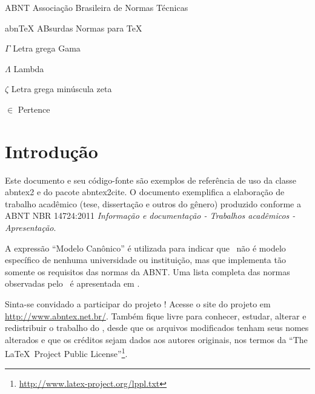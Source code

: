 \documentclass[
	12pt,				%
	openright,			%
    twoside,			%
	a4paper,			%
	english,			%
	french,				%
	spanish,			%
	brazil				%
	]{abntex2}
\numberwithin{lema}{chapter}
\numberwithin{teorema}{chapter}
\numberwithin{definicao}{chapter}
\numberwithin{figure}{chapter}
\begin{document}
\begin{siglas}
  \item[ABNT] Associação Brasileira de Normas Técnicas
  \item[abnTeX] ABsurdas Normas para TeX
\end{siglas}

\begin{simbolos}
  \item[$ \Gamma $] Letra grega Gama
  \item[$ \Lambda $] Lambda
  \item[$ \zeta $] Letra grega minúscula zeta
  \item[$ \in $] Pertence
\end{simbolos}

\tableofcontents*
\cleardoublepage



\textual


\chapter*[Introdução]{Introdução}

Este documento e seu código-fonte são exemplos de referência de uso da classe
\textsf{abntex2} e do pacote \textsf{abntex2cite}. O documento 
exemplifica a elaboração de trabalho acadêmico (tese, dissertação e outros do
gênero) produzido conforme a ABNT NBR 14724:2011 \emph{Informação e documentação
- Trabalhos acadêmicos - Apresentação}.

A expressão ``Modelo Canônico'' é utilizada para indicar que \abnTeX\ não é
modelo específico de nenhuma universidade ou instituição, mas que implementa tão
somente os requisitos das normas da ABNT. Uma lista completa das normas
observadas pelo \abnTeX\ é apresentada em .

Sinta-se convidado a participar do projeto \abnTeX! Acesse o site do projeto em
\url{http://www.abntex.net.br/}. Também fique livre para conhecer,
estudar, alterar e redistribuir o trabalho do \abnTeX, desde que os arquivos
modificados tenham seus nomes alterados e que os créditos sejam dados aos
autores originais, nos termos da ``The \LaTeX\ Project Public
License''\footnote{\url{http://www.latex-project.org/lppl.txt}}.
\end{document}

